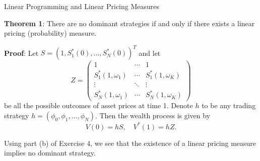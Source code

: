 \documentclass{beamer}
\begin{document}
\begin{frame}{Linear Programming and Linear Pricing Measures}

    {\footnotesize \footnotesize
    \par \textbf{Theorem 1}: There are no dominant strategies 
    if and only if there exists a linear pricing (probability) measure.
    \vspace{1em}
    \par  \pause \textbf{Proof}:
    Let $S = (1, S_1^*(0), \ldots, S_N^*(0))^T$ and let
    \[
    Z =
    \begin{pmatrix}
    1 & \cdots & 1 \\
    S_1^*(1, \omega_1) & \cdots & S_1^*(1, \omega_K) \\
    \vdots & \ddots & \vdots \\
    S_N^*(1, \omega_1) & \cdots & S_N^*(1, \omega_K)
    \end{pmatrix}
    \]
    be all the possible outcomes of asset prices at time 1. Denote $h$ to be any trading strategy $h = (\phi_0, \phi_1, \ldots, \phi_N)$. Then the wealth process is given by
    \[
    V(0) = hS, \quad V^*(1) = hZ.
    \]
    \par \pause  Using part (b) of Exercise 4, we 
    see that the existence of a linear pricing measure implies no dominant strategy.


    }
\end{frame}
\end{document}
